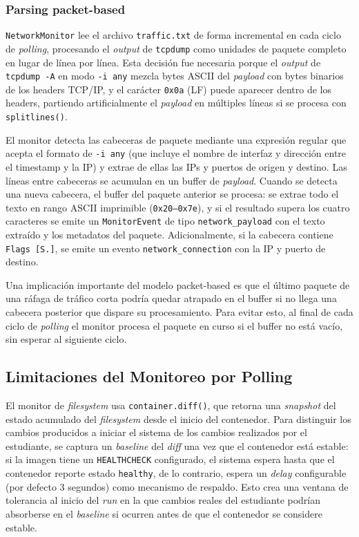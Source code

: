 \subsubsection*{Parsing packet-based}

\texttt{NetworkMonitor} lee el archivo \texttt{traffic.txt} de forma incremental
en cada ciclo de \textit{polling}, procesando el \textit{output} de
\texttt{tcpdump} como unidades de paquete completo en lugar de línea por línea.
Esta decisión fue necesaria porque el \textit{output} de \texttt{tcpdump -A} en
modo \texttt{-i any} mezcla bytes ASCII del \textit{payload} con bytes binarios
de los headers TCP/IP, y el carácter \texttt{0x0a} (LF) puede aparecer dentro de
los headers, partiendo artificialmente el \textit{payload} en múltiples líneas
si se procesa con \texttt{splitlines()}.

El monitor detecta las cabeceras de paquete mediante una expresión regular que
acepta el formato de \texttt{-i any} (que incluye el nombre de interfaz y
dirección entre el timestamp y la IP) y extrae de ellas las IPs y puertos de
origen y destino. Las líneas entre cabeceras se acumulan en un buffer de
\textit{payload}. Cuando se detecta una nueva cabecera, el buffer del paquete
anterior se
procesa: se extrae todo el texto en rango ASCII imprimible
(\texttt{0x20--0x7e}), y si el resultado supera los cuatro caracteres se emite
un \texttt{MonitorEvent} de tipo \texttt{network\_payload} con el texto extraído
y los metadatos del paquete. Adicionalmente, si la cabecera contiene
\texttt{Flags [S.]}, se emite un evento \texttt{network\_connection} con la IP y
puerto de destino.

Una implicación importante del modelo packet-based es que el último paquete de
una ráfaga de tráfico corta podría quedar atrapado en el buffer si no llega una
cabecera posterior que dispare su procesamiento. Para evitar esto, al final de
cada ciclo de \textit{polling} el monitor procesa el paquete en curso si el
buffer no
está vacío, sin esperar al siguiente ciclo.

\subsection{Limitaciones del Monitoreo por Polling}
\label{sec:limitaciones-polling}

El monitor de \textit{filesystem} usa \texttt{container.diff()}, que retorna una
\textit{snapshot} del estado acumulado del \textit{filesystem} desde el inicio
del contenedor. Para distinguir los cambios producidos a iniciar el sistema de
los cambios realizados por el estudiante, se captura un \textit{baseline} del
\textit{diff} una vez que el contenedor está estable: si la imagen tiene un
\texttt{HEALTHCHECK} configurado, el sistema espera hasta que el contenedor
reporte estado \texttt{healthy}, de lo contrario, espera un \textit{delay}
configurable (por defecto 3 segundos) como mecanismo de respaldo. Esto crea una
ventana de tolerancia al inicio del \textit{run} en la que cambios reales del
estudiante podrían absorberse en el \textit{baseline} si ocurren antes de que el
contenedor se considere estable.


